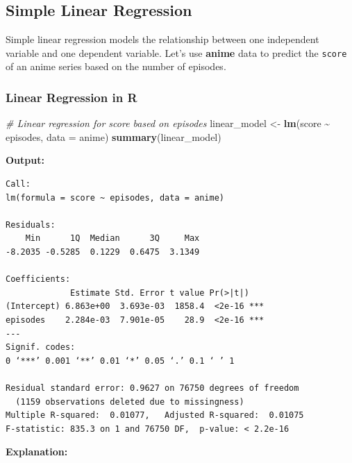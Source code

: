 \documentclass[
]{book}
\newenvironment{Shaded}{\begin{snugshade}}{\end{snugshade}}
\newcommand{\AttributeTok}[1]{\textcolor[rgb]{0.13,0.29,0.53}{#1}}
\newcommand{\CommentTok}[1]{\textcolor[rgb]{0.56,0.35,0.01}{\textit{#1}}}
\newcommand{\FunctionTok}[1]{\textcolor[rgb]{0.13,0.29,0.53}{\textbf{#1}}}
\newcommand{\NormalTok}[1]{#1}
\newcommand{\OtherTok}[1]{\textcolor[rgb]{0.56,0.35,0.01}{#1}}
\newcommand{\SpecialCharTok}[1]{\textcolor[rgb]{0.81,0.36,0.00}{\textbf{#1}}}
\begin{document}
\subsection*{Simple Linear Regression}\label{simple-linear-regression}

Simple linear regression models the relationship between one independent variable and one dependent variable. Let's use \textbf{anime} data to predict the \texttt{score} of an anime series based on the number of episodes.

\subsubsection*{Linear Regression in R}\label{linear-regression-in-r}

\begin{Shaded}
\begin{Highlighting}[]
\CommentTok{\# Linear regression for score based on episodes}
\NormalTok{linear\_model }\OtherTok{\textless{}{-}} \FunctionTok{lm}\NormalTok{(score }\SpecialCharTok{\textasciitilde{}}\NormalTok{ episodes, }\AttributeTok{data =}\NormalTok{ anime)}
\FunctionTok{summary}\NormalTok{(linear\_model)}
\end{Highlighting}
\end{Shaded}

\textbf{Output:}

\begin{verbatim}
Call:
lm(formula = score ~ episodes, data = anime)

Residuals:
    Min      1Q  Median      3Q     Max 
-8.2035 -0.5285  0.1229  0.6475  3.1349 

Coefficients:
             Estimate Std. Error t value Pr(>|t|)    
(Intercept) 6.863e+00  3.693e-03  1858.4  <2e-16 ***
episodes    2.284e-03  7.901e-05    28.9  <2e-16 ***
---
Signif. codes:  
0 ‘***’ 0.001 ‘**’ 0.01 ‘*’ 0.05 ‘.’ 0.1 ‘ ’ 1

Residual standard error: 0.9627 on 76750 degrees of freedom
  (1159 observations deleted due to missingness)
Multiple R-squared:  0.01077,   Adjusted R-squared:  0.01075 
F-statistic: 835.3 on 1 and 76750 DF,  p-value: < 2.2e-16
\end{verbatim}

\textbf{Explanation:}
\end{document}
